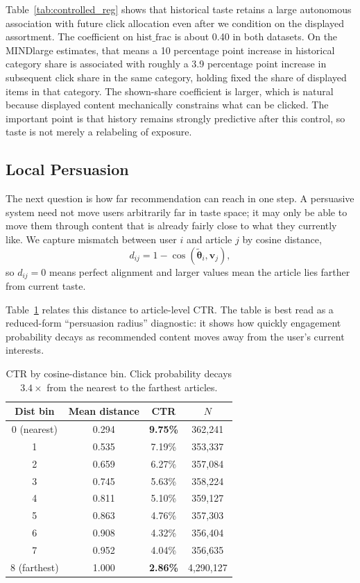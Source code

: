 \documentclass[11pt]{article}
\begin{document}
Table~\ref{tab:controlled_reg} shows that historical taste retains a large autonomous association with future click allocation even after we condition on the displayed assortment. The coefficient on $\text{hist\_frac}$ is about 0.40 in both datasets. On the MINDlarge estimates, that means a 10 percentage point increase in historical category share is associated with roughly a 3.9 percentage point increase in subsequent click share in the same category, holding fixed the share of displayed items in that category. The shown-share coefficient is larger, which is natural because displayed content mechanically constrains what can be clicked. The important point is that history remains strongly predictive after this control, so taste is not merely a relabeling of exposure.

\subsection{Local Persuasion}
\label{sec:persuasion}

The next question is how far recommendation can reach in one step. A persuasive system need not move users arbitrarily far in taste space; it may only be able to move them through content that is already fairly close to what they currently like. We capture mismatch between user $i$ and article $j$ by cosine distance,
\[
d_{ij} = 1 - \cos(\tilde{\boldsymbol{\theta}}_i,\mathbf{v}_j),
\]
so $d_{ij}=0$ means perfect alignment and larger values mean the article lies farther from current taste.

Table~\ref{tab:persuasion_radius} relates this distance to article-level CTR. The table is best read as a reduced-form ``persuasion radius'' diagnostic: it shows how quickly engagement probability decays as recommended content moves away from the user's current interests.

\begin{table}[ht]
\centering
\caption{CTR by cosine-distance bin. Click probability decays $3.4\times$ from the nearest to the farthest articles.}
\label{tab:persuasion_radius}
\begin{tabular}{cccc}
\toprule
Dist bin & Mean distance & CTR & $N$ \\
\midrule
0 (nearest) & 0.294 & \textbf{9.75\%} & 362,241 \\
1 & 0.535 & 7.19\% & 353,337 \\
2 & 0.659 & 6.27\% & 357,084 \\
3 & 0.745 & 5.63\% & 358,224 \\
4 & 0.811 & 5.10\% & 359,127 \\
5 & 0.863 & 4.76\% & 357,303 \\
6 & 0.908 & 4.32\% & 356,404 \\
7 & 0.952 & 4.04\% & 356,635 \\
8 (farthest) & 1.000 & \textbf{2.86\%} & 4,290,127 \\
\bottomrule
\end{tabular}
\end{table}
\FloatBarrier
\end{document}
